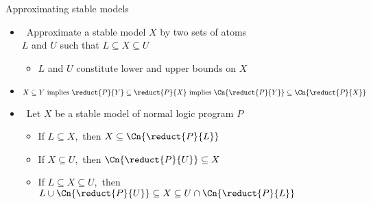\begin{frame}{Approximating stable models}
  \medskip
  \begin{itemize}
  \item<1->  \ Approximate a stable model $X$ by two sets of atoms\\
    $L$ and $U$ such that
    \(
    L\subseteq X\subseteq U
    \)
    \begin{itemize}\normalsize
    \item[\itarrow] $L$ and $U$ constitute lower and upper bounds on $X$
    \end{itemize}
    \smallskip
  \item<2-> 
    \[
    X\subseteq Y
    \text{ implies }
    \reduct{P}{Y}\subseteq \reduct{P}{X}
    \text{ implies }
    \Cn{\reduct{P}{Y}}\subseteq\Cn{\reduct{P}{X}}
    \]
  \item<3->  \
    Let $X$ be a stable model of normal logic program $P$
    \smallskip
    \begin{itemize}\normalsize
    \item<4-> If $L\subseteq X$,\pause[5]\
      then $X\subseteq\Cn{\reduct{P}{L}}$
    \smallskip
    \item<6-> If $X\subseteq U$,\pause[7]\
      then $\Cn{\reduct{P}{U}}\subseteq X$
    \smallskip
    \item<8-> If $L\subseteq X\subseteq U$,\pause[9]\
      then $L\cup\Cn{\reduct{P}{U}}\subseteq X\subseteq U\cap\Cn{\reduct{P}{L}}$
    \end{itemize}
  \end{itemize}
\end{frame}
